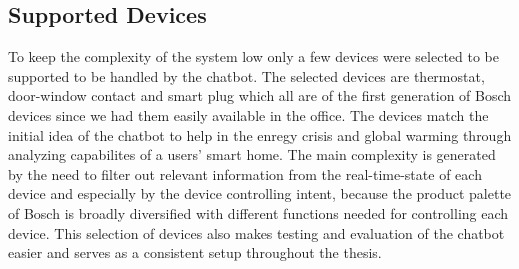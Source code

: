 \subsection{Supported Devices}
\label{subsec:devices}
To keep the complexity of the system low only a few devices were selected to be supported to be handled by the chatbot.
The selected devices are thermostat, door-window contact and smart plug which all are of the first generation of Bosch devices since we had them easily available in the office.
The devices match the initial idea of the chatbot to help in the enregy crisis and global warming through analyzing capabilites of a users' smart home.
The main complexity is generated by the need to filter out relevant information from the real-time-state of each device and especially by the device controlling intent, because the product palette of Bosch is broadly diversified with different functions needed for controlling each device. 
This selection of devices also makes testing and evaluation of the chatbot easier and serves as a consistent setup throughout the thesis.


